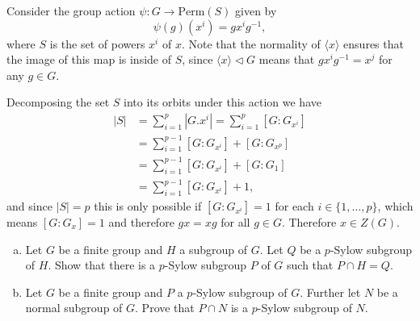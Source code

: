 \documentclass{article}
\newcounter{Problem}
\newenvironment{Problem}{\begin{Exercise}[name={Problem},
                                          counter={Problem}]}
                        {\end{Exercise}}
\begin{document}
\begin{Answer}
Consider the group action $\psi : G \to \mathrm{Perm}(S)$ given by
$$
\psi(g)(x^i) = g x^i g^{-1},
$$
where $S$ is the set of powers $x^i$ of $x$. Note that the normality
of $\langle x \rangle$ ensures that the image of this map is inside of
$S$, since $\langle x \rangle \triangleleft G$ means that
$g x^i g^{-1} = x^j$ for any $g \in G$.

Decomposing the set $S$ into its orbits under this action we have
\begin{align*}
|S| &= \sum_{i=1}^p |G . x^i| = \sum_{i=1}^p [G : G_{x^i}] \\
    &= \sum_{i=1}^{p-1} [G : G_{x^i}] + [G : G_{x^p}] \\
    &= \sum_{i=1}^{p-1} [G : G_{x^i}] + [G : G_1] \\
    &= \sum_{i=1}^{p-1} [G : G_{x^i}] + 1,
\end{align*}
and since $|S| = p$ this is only possible if $[G : G_{x^i}] = 1$ for
each $i \in \{ 1, \dots, p \}$, which means $[G : G_x] = 1$ and
therefore $gx = xg$ for all $g \in G$. Therefore $x \in Z(G)$.


%
%
\end{Answer}

\pagebreak
\begin{Problem}
\begin{enumerate}[(a)]
\item{Let $G$ be a finite group and $H$ a subgroup of $G$. Let $Q$ be
    a $p$-Sylow subgroup of $H$. Show that there is a $p$-Sylow
    subgroup $P$ of $G$ such that $P \cap H = Q$.}
\item{Let $G$ be a finite group and $P$ a $p$-Sylow subgroup of
    $G$. Further let $N$ be a normal subgroup of $G$. Prove that $P
    \cap N$ is a $p$-Sylow subgroup of $N$.}
\end{enumerate}
\end{Problem}
\end{document}
